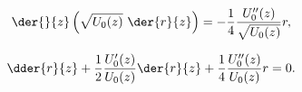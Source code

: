 

\begin{equation}
  \der{}{z} \left( \sqrt{U_0(z)}\ \der{r}{z} \right) = -\frac{1}{4}
    \frac{U_0''(z)}{\sqrt{U_0(z)}} r,
  \label{eq09equation}
\end{equation}

\begin{equation}
  \dder{r}{z} + \frac{1}{2} \frac{U_0'(z)}{U_0(z)} \der{r}{z} + \frac{1}{4}
    \frac{U_0''(z)}{U_0(z)} r = 0.
  \label{eq09paraxial}
\end{equation}
